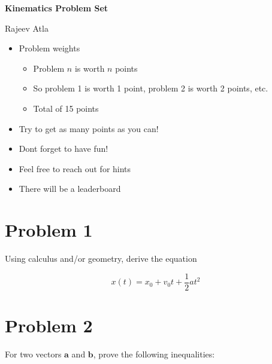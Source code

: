 \documentclass[11pt]{scrartcl}
\begin{document}
\titleformat{\section}{\normalfont\Large\bfseries}{\color{red}\S \thesection}{0.5em}{}
\titleformat{\subsection}{\normalfont\Large\bfseries}{\color{olive}\S \thesubsection}{0.5em}{}
\titleformat{\subsubsection}{\normalfont\Large\bfseries}{\color{blue}\S \thesubsubsection}{0.5em}{}

\begin{center}
    \Large \textbf{Kinematics Problem Set}
\end{center}
\begin{center}
    \Large Rajeev Atla
\end{center}

\begin{itemize}
    \item Problem weights
    \begin{itemize}
        \item Problem $n$ is worth $n$ points
        \item So problem 1 is worth 1 point, problem 2 is worth 2 points, etc.
        \item Total of 15 points
    \end{itemize}
    \item Try to get as many points as you can!
    \item Dont forget to have fun!
    \item Feel free to reach out for hints
    \item There will be a leaderboard
\end{itemize}

\section{Problem 1}
Using calculus and/or geometry, derive the equation

$$
x(t) = x_0 + v_0 t + \frac{1}{2} at^2
$$

\section{Problem 2}
For two vectors $\bm{a}$ and $\bm{b}$, prove the following inequalities:
\end{document}

